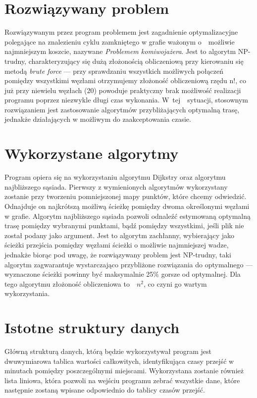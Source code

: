 \documentclass[12pt,a4paper]{article}
\begin{document}
\section{Rozwiązywany problem}
Rozwiązywanym przez program problemem jest zagadnienie optymalizacyjne polegające na znalezieniu cyklu zamkniętego w grafie ważonym o~~możliwie najmniejszym koszcie, nazywane \textsl{Problemem komiwojażera}. Jest to algorytm NP-trudny, charakteryzujący się dużą złożonością obliczeniową przy kierowaniu się metodą \textsl{brute force} --- przy sprawdzaniu wszystkich możliwych połączeń pomiędzy wszystkimi węzłami otrzymujemy złożoność obliczeniową rzędu n!, co już przy niewielu węzłach (20) powoduje praktyczny brak możliwość realizacji programu poprzez niezwykle długi czas wykonania. W~tej~~sytuacji, stosownym rozwiązaniem jest zastosowanie algorytmów przybliżających optymalną trasę, jednakże działających w możliwym do zaakceptowania czasie.
\section{Wykorzystane algorytmy}
Program opiera się na wykorzystaniu algorytmu Dijkstry oraz algorytmu najbliższego sąsiada. Pierwszy z wymienionych algorytmów wykorzystany zostanie przy tworzeniu pomniejszonej mapy punktów, które chcemy odwiedzić. Odnajduje on najkrótszą możliwą ścieżkę pomiędzy dwoma określonymi węzłami w grafie. Algorytm najbliższego sąsiada pozwoli odnaleźć estymowaną optymalną trasę pomiędzy wybranymi punktami, bądź pomiędzy wszystkimi, jeśli plik  nie został podany jako argument. Jest to algorytm zachłanny, wybierający jako ścieżki przejścia pomiędzy węzłami ścieżki o możliwie najmniejszej wadze, jednakże biorąc pod uwagę, że rozwiązywany problem jest NP-trudny, taki algorytm zagwarantuje wystarczająco przybliżone rozwiązania do optymalnego --- wyznaczone ścieżki powinny być maksymalnie 25\% gorsze od optymalnej. Dla tego algorytmu złożoność obliczeniowa to~~$n^2$, co czyni go wartym wykorzystania.
\section{Istotne struktury danych}
Główną strukturą danych, którą będzie wykorzystywał program jest dwuwymiarowa tablica wartości całkowitych, identyfikująca czasy przejść w minutach pomiędzy poszczególnymi miejscami. Wykorzystana zostanie również lista liniowa, która pozwoli na wejściu programu zebrać wszystkie dane, które następnie zostaną wpisane odpowiednio do tablicy czasów przejść.
\end{document}
